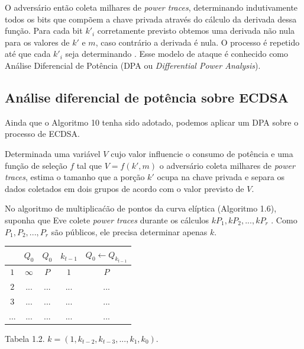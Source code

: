 O advers\'{a}rio ent\~{a}o coleta milhares de \textit{power traces}, determinando indutivamente todos os bits que comp\~{o}em a chave privada atrav\'{e}s do c\'{a}lculo da derivada dessa fun\c{c}\~{a}o. Para cada bit $k'_{i}$ corretamente previsto obtemos uma derivada n\~{a}o nula para os valores de $k'$ e $m$, caso contr\'{a}rio a derivada \'{e} nula. O processo \'{e} repetido at\'{e} que cada $k'_{i}$ seja determinando \cite{ECCBook_HankersonVanstone2004}. Esse modelo de ataque \'{e} conhecido como An\'{a}lise Diferencial de Pot\^{e}ncia (DPA ou \textit{Differential Power Analysis}).


\subsection{An\'{a}lise diferencial de pot\^{e}ncia sobre ECDSA}
Ainda que o Algoritmo 10 tenha sido adotado, podemos aplicar um DPA sobre o processo de ECDSA. 

Determinada uma vari\'{a}vel $V$ cujo valor influencie o consumo de pot\^{e}ncia e uma fun\c{c}\~{a}o de sele\c{c}\~{a}o $f$ tal que $V = f(k', m)$ o advers\'{a}rio coleta milhares de \textit{power traces}, estima o tamanho que a por\c{c}\~{a}o $k'$ ocupa na chave privada e separa os dados coletados em dois grupos de acordo com o valor previsto de $V$.

No algoritmo de multiplica\'{c}\~{a}o de pontos da curva el\'{i}ptica (Algoritmo 1.6), suponha que Eve colete \textit{power traces} durante os c\'{a}lculos $kP_{1} , kP_{2} , ..., kP_{r}$ . Como $P_{1} , P_{2} , ..., P_{r}$ s\~{a}o p\'{u}blicos, ele precisa determinar apenas $k$.

\begin{center}
    \begin{tabular}{|c|c|c|c|c|}
	    \hline
		    \   & $Q_{0}$  & $Q_{0}$ & $k_{t-1}$ & $Q_{0} \leftarrow Q_{k_{t-1}}$\\
	    \hline
	        $1$ & $\infty$ &     $P$ &       $1$ & $P$\\
	    \hline
		    $2$ & ... & ... & ... & ...\\
	    \hline
		    $3$ & ... & ... & ...& ... \\
	    \hline
		    ... & ... & ... & ...& ... \\
	    \hline
    \end{tabular}

    Tabela 1.2. $k = (1, k_{t-2}, k_{t-3}, ..., k_{1}, k_{0})$.
\end{center}

